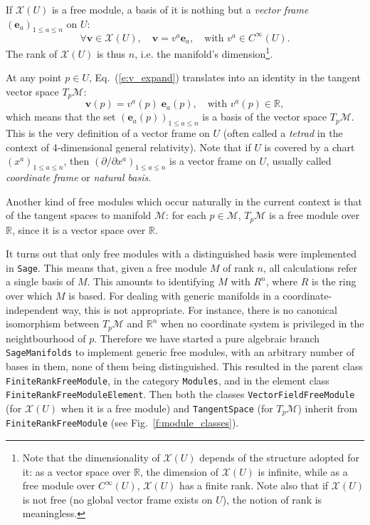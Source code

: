 \documentclass[a4paper]{jpconf}
\newcommand{\soft}[1]{\texttt{#1}}
\newcommand{\code}[1]{\texttt{#1}}
\newcommand{\Sage}{\soft{Sage}}
\newcommand{\SM}{\soft{SageManifolds}}
\newcommand{\be}{\begin{equation}}
\newcommand{\ee}{\end{equation}}
\newcommand{\w}[1]{\bm{#1}}
\begin{document}
If $\mathcal{X}(U)$ is a free module, a basis of it is nothing but a \emph{vector frame}
$(\w{e}_a)_{1\leq a \leq n}$ on $U$:
\be \label{e:v_expand}
    \forall \w{v}\in\mathcal{X}(U),\quad \w{v} = v^a \w{e}_a,\quad\mbox{with\ } v^a \in C^\infty(U) .
\ee
The rank of $\mathcal{X}(U)$ is thus $n$, i.e. the manifold's 
dimension\footnote{Note that the dimensionality of $\mathcal{X}(U)$ depends
of the structure adopted for it: as a vector space over $\mathbb{R}$, the
dimension of $\mathcal{X}(U)$ is infinite, while as a free module over
$C^\infty(U)$, $\mathcal{X}(U)$ has a finite rank. Note also that if $\mathcal{X}(U)$
is not free (no global vector frame exists on $U$), the notion of rank 
is meaningless.}.

At any point $p\in U$, Eq.~(\ref{e:v_expand}) translates into an identity in 
the tangent vector space $T_p \mathcal{M}$:
\be 
    \w{v}(p) = v^a(p)  \; \w{e}_a(p),\quad\mbox{with\ } v^a(p) \in \mathbb{R} , 
\ee
which means that 
the set $(\w{e}_a(p))_{1\leq a \leq n}$ is a basis of the vector space $T_p \mathcal{M}$.
This is the very definition of a vector frame on $U$ (often called a \emph{tetrad} in
the context of 4-dimensional general relativity). Note that if $U$ is covered
by a chart $(x^a)_{1\leq a \leq n}$, then $(\partial/\partial x^a)_{1\leq a \leq n}$
is a vector frame on $U$, usually called \emph{coordinate frame}
or \emph{natural basis}. 


Another kind of free modules which occur naturally in the current context
is that of the tangent spaces to manifold $\mathcal{M}$: 
for each $p\in \mathcal{M}$, $T_p\mathcal{M}$ is a free module over 
$\mathbb{R}$, since it is a vector space over $\mathbb{R}$. 

It turns out that only free modules with a distinguished basis were 
implemented in \Sage{}. This means that, given a free module $M$ of rank $n$, 
all calculations refer a single basis of $M$. This amounts to identifying
$M$ with $R^n$, where $R$ is the ring over which $M$ is based. 
For dealing with generic manifolds in a coordinate-independent way, 
this is not appropriate. For instance, there is no canonical 
isomorphism between $T_p\mathcal{M}$ and $\mathbb{R}^n$ when no coordinate
system is privileged in the neightbourhood of $p$.
Therefore we have started a pure algebraic branch \SM{} to implement
generic free modules, with an arbitrary number of bases in them, 
none of them being distinguished. This resulted in the parent class 
\code{FiniteRankFreeModule}, in the category \code{Modules}, and in the element class 
\code{FiniteRankFreeModuleElement}. Then both the classes
\code{VectorFieldFreeModule} (for $\mathcal{X}(U)$ when it is 
a free module) and \code{TangentSpace} (for $T_p\mathcal{M}$)
inherit from \code{FiniteRankFreeModule} (see Fig.~\ref{f:module_classes}). 
\end{document}
